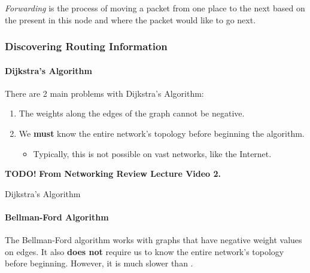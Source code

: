 \begin{definition}[Forwarding]\label{def:Forwarding}
  \emph{Forwarding} is the process of moving a packet from one place to the next based on the  present in this node and where the packet would like to go next.
\end{definition}

\subsubsection{Discovering Routing Information}\label{subsubsec:Discovering_Route_Info}
\paragraph{Dijkstra's Algorithm}\label{par:Dijkstras_Algorithm}
There are 2 main problems with Dijkstra's Algorithm:
\begin{enumerate}[noitemsep]
\item The weights along the edges of the graph cannot be negative.
\item We \textbf{must} know the entire network's topology before beginning the algorithm.
  \begin{itemize}[noitemsep]
  \item Typically, this is not possible on vast networks, like the Internet.
  \end{itemize}
\end{enumerate}

\begin{algorithm}[H]
  \DontPrintSemicolon{}
  \BlankLine{}

  \textbf{TODO!}\;
  \textbf{From Networking Review Lecture Video 2.} \;
  
  \caption{Dijkstra's Algorithm}
  \label{algo:Dijkstras_Algorithm}
\end{algorithm}

\paragraph{Bellman-Ford Algorithm}\label{par:Bellman_Ford_Algorithm}
The Bellman-Ford algorithm works with graphs that have negative weight values on edges.
It also \textbf{does not} require us to know the entire network's topology before beginning.
However, it is much slower than .


